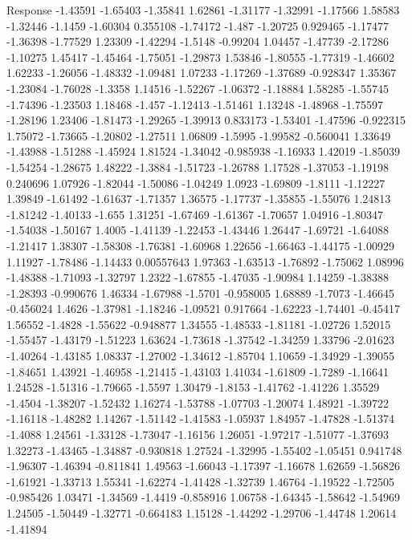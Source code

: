 \documentclass[9pt]{article}
\theoremstyle{plain}
\theoremstyle{definition}
\theoremstyle{remark}
\numberwithin{equation}{section}
\begin{document}
Response
-1.43591
-1.65403
-1.35841
1.62861
-1.31177
-1.32991
-1.17566
1.58583
-1.32446
-1.1459
-1.60304
0.355108
-1.74172
-1.487
-1.20725
0.929465
-1.17477
-1.36398
-1.77529
1.23309
-1.42294
-1.5148
-0.99204
1.04457
-1.47739
-2.17286
-1.10275
1.45417
-1.45464
-1.75051
-1.29873
1.53846
-1.80555
-1.77319
-1.46602
1.62233
-1.26056
-1.48332
-1.09481
1.07233
-1.17269
-1.37689
-0.928347
1.35367
-1.23084
-1.76028
-1.3358
1.14516
-1.52267
-1.06372
-1.18884
1.58285
-1.55745
-1.74396
-1.23503
1.18468
-1.457
-1.12413
-1.51461
1.13248
-1.48968
-1.75597
-1.28196
1.23406
-1.81473
-1.29265
-1.39913
0.833173
-1.53401
-1.47596
-0.922315
1.75072
-1.73665
-1.20802
-1.27511
1.06809
-1.5995
-1.99582
-0.560041
1.33649
-1.43988
-1.51288
-1.45924
1.81524
-1.34042
-0.985938
-1.16933
1.42019
-1.85039
-1.54254
-1.28675
1.48222
-1.3884
-1.51723
-1.26788
1.17528
-1.37053
-1.19198
0.240696
1.07926
-1.82044
-1.50086
-1.04249
1.0923
-1.69809
-1.8111
-1.12227
1.39849
-1.61492
-1.61637
-1.71357
1.36575
-1.17737
-1.35855
-1.55076
1.24813
-1.81242
-1.40133
-1.655
1.31251
-1.67469
-1.61367
-1.70657
1.04916
-1.80347
-1.54038
-1.50167
1.4005
-1.41139
-1.22453
-1.43446
1.26447
-1.69721
-1.64088
-1.21417
1.38307
-1.58308
-1.76381
-1.60968
1.22656
-1.66463
-1.44175
-1.00929
1.11927
-1.78486
-1.14433
0.00557643
1.97363
-1.63513
-1.76892
-1.75062
1.08996
-1.48388
-1.71093
-1.32797
1.2322
-1.67855
-1.47035
-1.90984
1.14259
-1.38388
-1.28393
-0.990676
1.46334
-1.67988
-1.5701
-0.958005
1.68889
-1.7073
-1.46645
-0.456024
1.4626
-1.37981
-1.18246
-1.09521
0.917664
-1.62223
-1.74401
-0.45417
1.56552
-1.4828
-1.55622
-0.948877
1.34555
-1.48533
-1.81181
-1.02726
1.52015
-1.55457
-1.43179
-1.51223
1.63624
-1.73618
-1.37542
-1.34259
1.33796
-2.01623
-1.40264
-1.43185
1.08337
-1.27002
-1.34612
-1.85704
1.10659
-1.34929
-1.39055
-1.84651
1.43921
-1.46958
-1.21415
-1.43103
1.41034
-1.61809
-1.7289
-1.16641
1.24528
-1.51316
-1.79665
-1.5597
1.30479
-1.8153
-1.41762
-1.41226
1.35529
-1.4504
-1.38207
-1.52432
1.16274
-1.53788
-1.07703
-1.20074
1.48921
-1.39722
-1.16118
-1.48282
1.14267
-1.51142
-1.41583
-1.05937
1.84957
-1.47828
-1.51374
-1.4088
1.24561
-1.33128
-1.73047
-1.16156
1.26051
-1.97217
-1.51077
-1.37693
1.32273
-1.43465
-1.34887
-0.930818
1.27524
-1.32995
-1.55402
-1.05451
0.941748
-1.96307
-1.46394
-0.811841
1.49563
-1.66043
-1.17397
-1.16678
1.62659
-1.56826
-1.61921
-1.33713
1.55341
-1.62274
-1.41428
-1.32739
1.46764
-1.19522
-1.72505
-0.985426
1.03471
-1.34569
-1.4419
-0.858916
1.06758
-1.64345
-1.58642
-1.54969
1.24505
-1.50449
-1.32771
-0.664183
1.15128
-1.44292
-1.29706
-1.44748
1.20614
-1.41894
\end{document}
